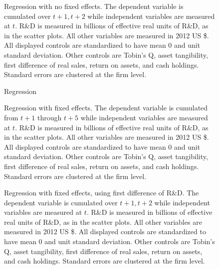 \documentclass[12pt,english]{article}
\theoremstyle{remark}
\begin{document}
\begin{figure}[p]
	\centering
	
	\caption{Regression with no fixed effects. The dependent variable is cumulated over $t+1,t+2$ while independent variables are measured at $t$. R\&D is measured in billions of effective real units of R\&D, as in the scatter plots. All other variables are measured in 2012 US \$. All displayed controls are standardized to have mean 0 and unit standard deviation. Other controls are Tobin's Q, asset tangibility, first difference of real sales, return on assets, and cash holdings. Standard errors are clustered at the firm level.}
	\label{regs_allSpinouts_nofe}
\end{figure}

\begin{figure}[p]
	\centering
	
	\caption{Regression}
	\label{regs_allSpinouts_fd_nofe}
\end{figure}

\begin{figure}[p]
	\centering
	
	\caption{Regression with fixed effects. The dependent variable is cumulated from $t+1$ through $t+5$ while independent variables are measured at $t$. R\&D is measured in billions of effective real units of R\&D, as in the scatter plots. All other variables are measured in 2012 US \$. All displayed controls are standardized to have mean 0 and unit standard deviation. Other controls are Tobin's Q, asset tangibility, first difference of real sales, return on assets, and cash holdings. Standard errors are clustered at the firm level.}
	\label{regs_allSpinouts_FE}
\end{figure}

\begin{figure}[p]
	\centering
	
	\caption{Regression with fixed effects, using first difference of R\&D. The dependent variable is cumulated over $t+1,t+2$ while independent variables are measured at $t$. R\&D is measured in billions of effective real units of R\&D, as in the scatter plots. All other variables are measured in 2012 US \$. All displayed controls are standardized to have mean 0 and unit standard deviation. Other controls are Tobin's Q, asset tangibility, first difference of real sales, return on assets, and cash holdings. Standard errors are clustered at the firm level.}
	\label{regs_allSpinouts_fd_FE}
\end{figure}
\end{document}
